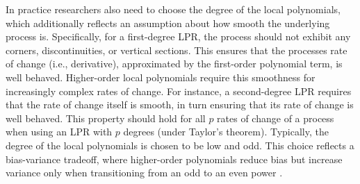 
In practice researchers also need to choose the degree of the local
polynomials, which additionally reflects an assumption about how smooth the
underlying process is. Specifically, for a first-degree LPR, the process should
not exhibit any corners, discontinuities, or vertical sections. This ensures
that the processes rate of change (i.e., derivative), approximated by the
first-order polynomial term, is well behaved. Higher-order local polynomials
require this smoothness for increasingly complex rates of change. For instance,
a second-degree LPR requires that the rate of change itself is smooth, in turn
ensuring that its rate of change is well behaved. This property should hold for
all $p$ rates of change of a process when using an LPR with $p$ degrees (under
Taylor's theorem). Typically, the degree of the local polynomials is chosen to
be low and odd. This choice reflects a bias-variance tradeoff, where
higher-order polynomials reduce bias but increase variance only when
transitioning from an odd to an even power
\parencite{ruppert_multivariate_1994}.